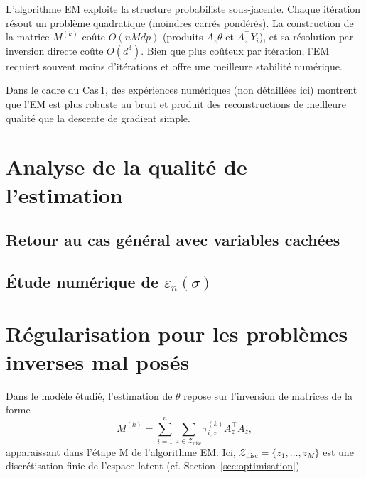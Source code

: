 \documentclass[12pt, a4paper]{article}
\theoremstyle{definition}
\begin{document}
L'algorithme EM exploite la structure probabiliste sous‑jacente. Chaque itération résout un problème quadratique (moindres carrés pondérés). La construction de la matrice $M^{(k)}$ coûte $O(nMdp)$ (produits $A_z\theta$ et $A_z^\top Y_i$), et sa résolution par inversion directe coûte $O(d^3)$. Bien que plus coûteux par itération, l'EM requiert souvent moins d'itérations et offre une meilleure stabilité numérique.

Dans le cadre du Cas 1, des expériences numériques (non détaillées ici) montrent que l'EM est plus robuste au bruit et produit des reconstructions de meilleure qualité que la descente de gradient simple.
%


\newpage
\section{Analyse de la qualité de l'estimation}
\label{sec:analyse_erreur}

\subsection{Retour au cas général avec variables cachées}
\label{subsec:avec_variables_cachees}

\subsection{Étude numérique de \texorpdfstring{$\varepsilon_n(\sigma)$}{epsilon_n(sigma)}}
\label{subsec:etude_numerique_erreur}

\newpage
\section{Régularisation pour les problèmes inverses mal posés}

Dans le modèle étudié, l'estimation de $\theta$ repose sur l'inversion de matrices de la forme
\[
M^{(k)} = \sum_{i=1}^n \sum_{z\in\mathcal{Z}_{\text{disc}}} \tau_{i,z}^{(k)} A_z^\top A_z,
\]
apparaissant dans l'étape M de l'algorithme EM. Ici, $\mathcal{Z}_{\text{disc}} = \{z_1,\dots,z_M\}$ est une discrétisation finie de l'espace latent (cf. Section~\ref{sec:optimisation}).
\end{document}
